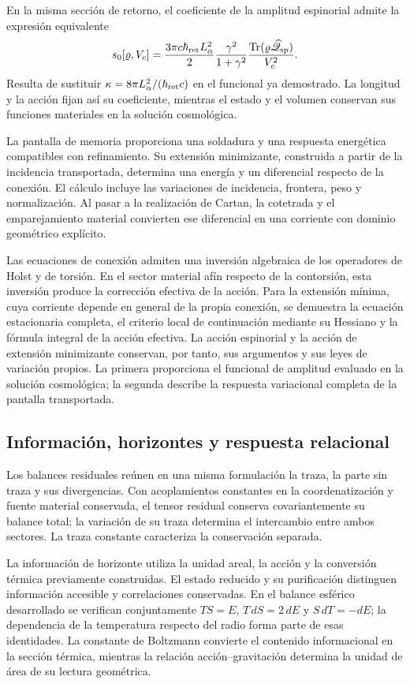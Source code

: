 En la misma sección de retorno, el coeficiente de la amplitud espinorial
admite la expresión equivalente
\[
 s_0[\varrho,V_c]
 =\frac{3\pi c\hbar_{\rm ret}L_\alpha^2}{2}
   \frac{\gamma^2}{1+\gamma^2}
   \frac{\operatorname{Tr}(\varrho\widehat{\mathscr Q}_{\rm sp})}{V_c^2}.
\]
Resulta de sustituir \(\kappa=8\pi L_\alpha^2/(\hbar_{\rm ret}c)\)
en el funcional ya demostrado. La longitud y la acción fijan así su
coeficiente, mientras el estado y el volumen conservan sus funciones
materiales en la solución cosmológica.

La pantalla de memoria proporciona una soldadura y una respuesta
energética compatibles con refinamiento. Su extensión minimizante,
construida a partir de la incidencia transportada, determina una
energía y un diferencial respecto de la conexión. El cálculo incluye
las variaciones de incidencia, frontera, peso y normalización. Al
pasar a la realización de Cartan, la cotetrada y el emparejamiento
material convierten ese diferencial en una corriente con dominio
geométrico explícito.

Las ecuaciones de conexión admiten una inversión algebraica de los
operadores de Holst y de torsión. En el sector material afín respecto
de la contorsión, esta inversión produce la corrección efectiva de
la acción. Para la extensión mínima, cuya corriente depende en
general de la propia conexión, se demuestra la ecuación estacionaria
completa, el criterio local de continuación mediante su Hessiano
y la fórmula integral de la acción efectiva. La acción espinorial y
la acción de extensión minimizante conservan, por tanto, sus argumentos
y sus leyes de variación propios. La primera proporciona el funcional de
amplitud evaluado en la solución cosmológica; la segunda describe la
respuesta variacional completa de la pantalla transportada.

\subsection{Información, horizontes y respuesta relacional}

Los balances residuales reúnen en una misma formulación la traza,
la parte sin traza y sus divergencias. Con acoplamientos constantes
en la coordenatización y fuente material conservada, el tensor residual
conserva covariantemente su balance total; la variación de su
traza determina el intercambio entre ambos sectores. La traza
constante caracteriza la conservación separada.

La información de horizonte utiliza la unidad areal,
la acción y la conversión térmica previamente construidas.
El estado reducido y su purificación distinguen información
accesible y correlaciones conservadas. En el balance esférico
desarrollado se verifican conjuntamente \(TS=E\),
\(T\,dS=2\,dE\) y \(S\,dT=-dE\); la dependencia de
la temperatura respecto del radio forma parte de esas identidades.
La constante de Boltzmann convierte el contenido informacional
en la sección térmica, mientras la relación acción--gravitación
determina la unidad de área de su lectura geométrica.

